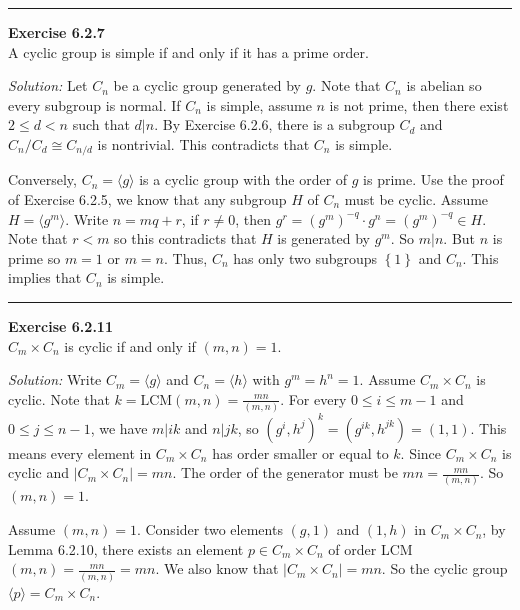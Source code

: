 \documentclass[a4paper, 12pt]{article}
\newenvironment{problem}[2][Exercise]
    { \begin{mdframed}[backgroundcolor=gray!20] \textbf{#1 #2} \\}
    {  \end{mdframed}}
\newenvironment{solution}
    {\textit{Solution:}}
    {}
\begin{document}
\noindent\rule{7in}{2.8pt}
\begin{problem}{6.2.7}
A cyclic group is simple if and only if it has a prime order.
\end{problem}
\begin{solution}
Let \(C_n\) be a cyclic group generated by \(g\). Note that \(C_n\) is abelian so every subgroup is normal. If \(C_n\) is simple, assume \(n\) is not prime, then there exist \(2\leq d<n\) such that \(d|n\). By Exercise 6.2.6, there is a 
subgroup \(C_d\) and \(C_n/C_d\cong C_{n/d}\) is nontrivial. This contradicts that \(C_n\) is simple.

Conversely, \(C_n=\langle g\rangle\) is a cyclic group with the order of \(g\) is prime. Use the proof of Exercise 6.2.5, we know that any subgroup \(H\) of \(C_n\) must be cyclic. Assume \(H=\langle g^m\rangle\). Write \(n=mq+r\), if \(r\neq 0\), then 
\(g^r=(g^m)^{-q}\cdot g^n=(g^m)^{-q}\in H\). Note that \(r<m\) so this contradicts that \(H\) is generated by \(g^m\). So \(m|n\). But \(n\) is prime so \(m=1\) or \(m=n\). Thus, \(C_n\) has only two subgroups \(\left\{ 1 \right\}\) and \(C_n\). This implies that 
\(C_n\) is simple. 
\end{solution}

\noindent\rule{7in}{2.8pt}
\begin{problem}{6.2.11}
\(C_m\times C_n\) is cyclic if and only if \((m,n)=1\).
\end{problem}
\begin{solution}
Write \(C_m=\langle g\rangle\) and \(C_n=\langle h\rangle\) with \(g^m=h^n=1\). Assume \(C_m\times C_n\) is cyclic. Note that \(k=\text{LCM}(m,n)=\frac{mn}{(m,n)}\). For every \(0\leq i\leq m-1\) and \(0\leq j\leq n-1\), we have \(m|ik\) and \(n|jk\), so 
\((g^i,h^j)^k =(g^{ik},h^{jk})=(1,1)\). This means every element in \(C_m\times C_n\) has order smaller or equal to \(k\). Since \(C_m\times C_n\) is cyclic and \(|C_m\times C_n|=mn\). The order of the generator must be \(mn=\frac{mn}{(m,n)}\). So \((m,n)=1\). 

Assume \((m,n)=1\). Consider two elements \((g,1)\) and \((1,h)\) in \(C_m\times C_n\), by Lemma 6.2.10, there exists an element \(p\in C_m\times C_n\) of order LCM\((m,n)=\frac{mn}{(m,n)}=mn\). We also know that \(|C_m\times C_n|=mn\). So the cyclic group 
\(\langle p\rangle=C_m\times C_n\).
\end{solution}
\end{document}
